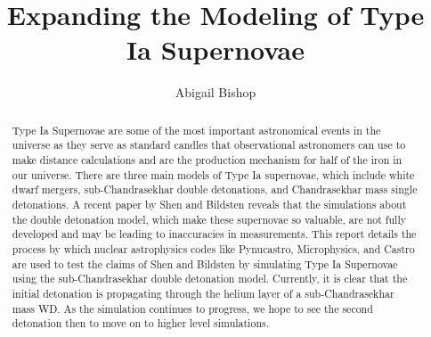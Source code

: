 \documentclass[preprint]{aastex62}
\begin{document}
\title{Expanding the Modeling of Type Ia Supernovae}
\author{Abigail Bishop}

  

\begin{abstract}
  
  Type Ia Supernovae are some of the most important astronomical events in the universe as they serve as standard candles that observational astronomers can use to make distance calculations and are the production mechanism for half of the iron in our universe. There are three main models of Type Ia supernovae, which include white dwarf mergers, sub-Chandrasekhar double detonations, and Chandrasekhar mass single detonations. A recent paper by Shen and Bildsten reveals that the simulations about the double detonation model, which make these supernovae so valuable, are not fully developed and may be leading to inaccuracies in measurements. This report details the process by which nuclear astrophysics codes like Pynucastro, Microphysics, and Castro are used to test the claims of Shen and Bildsten by simulating Type Ia Supernovae using the sub-Chandrasekhar double detonation model. Currently, it is clear that the initial detonation is propagating through the helium layer of a sub-Chandrasekhar mass WD. As the simulation continues to progress, we hope to see the second detonation then to move on to higher level simulations.

\end{abstract}
\end{document}
